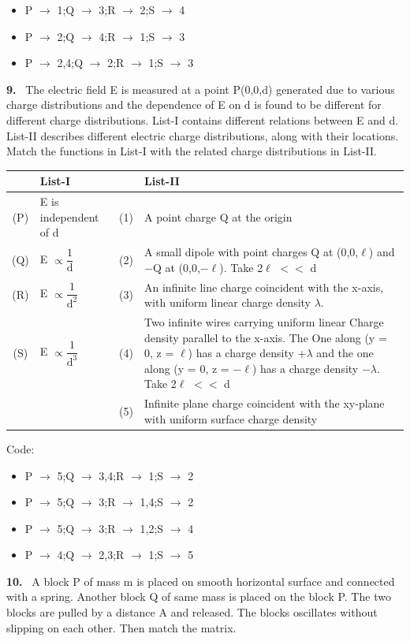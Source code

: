 \documentclass[10pt]{extarticle}
\newcommand{\qn}[1]{\par\smallskip\noindent\textbf{#1.}~}
\newenvironment{qoptions}{\begin{itemize}[leftmargin=1.8em,itemsep=1pt,topsep=2pt,label={}]}{\end{itemize}}
\newcommand{\opt}[2]{\item[(#1)] #2}
\begin{document}
\begin{multicols}{2}
\begin{qoptions}
\opt{B}{P $\rightarrow$ 1;Q $\rightarrow$ 3;R $\rightarrow$ 2;S $\rightarrow$ 4}
\opt{C}{P $\rightarrow$ 2;Q $\rightarrow$ 4;R $\rightarrow$ 1;S $\rightarrow$ 3}
\opt{D}{P $\rightarrow$ 2,4;Q $\rightarrow$ 2;R $\rightarrow$ 1;S $\rightarrow$ 3}
\end{qoptions}
\qn{9} The electric field E is measured at a point P(0,0,d) generated due to various charge distributions and the dependence of E on d is found to be different for different charge distributions. List-I contains different relations between E and d. List-II describes different electric charge distributions, along with their locations. Match the functions in List-I with the related charge distributions in List-II.\par
{\footnotesize\setlength{\tabcolsep}{1.5pt}\noindent\begin{tabular}{|c|L{1.7cm}|c|L{4.1cm}|}
\hline
 & List-I & & List-II \\
\hline
(P) & E is independent of d & (1) & A point charge Q at the origin \\
\hline
(Q) & E $\propto\dfrac{1}{\text{d}}$ & (2) & A small dipole with point charges Q at (0,0,$\ell$) and $-$Q at (0,0,$-\ell$). Take 2$\ell$ $<<$ d \\
\hline
(R) & E $\propto\dfrac{1}{\text{d}^2}$ & (3) & An infinite line charge coincident with the x-axis, with uniform linear charge density $\lambda$. \\
\hline
(S) & E $\propto\dfrac{1}{\text{d}^3}$ & (4) & Two infinite wires carrying uniform linear Charge density parallel to the x-axis. The One along (y = 0, z = $\ell$) has a charge density +$\lambda$ and the one along (y = 0, z = $-\ell$) has a charge density $-\lambda$. Take 2$\ell$ $<<$ d \\
\hline
 & & (5) & Infinite plane charge coincident with the xy-plane with uniform surface charge density \\
\hline
\end{tabular}}\par
Code:
\begin{qoptions}
\opt{A}{P $\rightarrow$ 5;Q $\rightarrow$ 3,4;R $\rightarrow$ 1;S $\rightarrow$ 2}
\opt{B}{P $\rightarrow$ 5;Q $\rightarrow$ 3;R $\rightarrow$ 1,4;S $\rightarrow$ 2}
\opt{C}{P $\rightarrow$ 5;Q $\rightarrow$ 3;R $\rightarrow$ 1,2;S $\rightarrow$ 4}
\opt{D}{P $\rightarrow$ 4;Q $\rightarrow$ 2,3;R $\rightarrow$ 1;S $\rightarrow$ 5}
\end{qoptions}
\qn{10} A block P of mass m is placed on smooth horizontal surface and connected with a spring. Another block Q of same mass is placed on the block P. The two blocks are pulled by a distance A and released. The blocks oscillates without slipping on each other. Then match the matrix.\par

\end{multicols}
\end{document}
